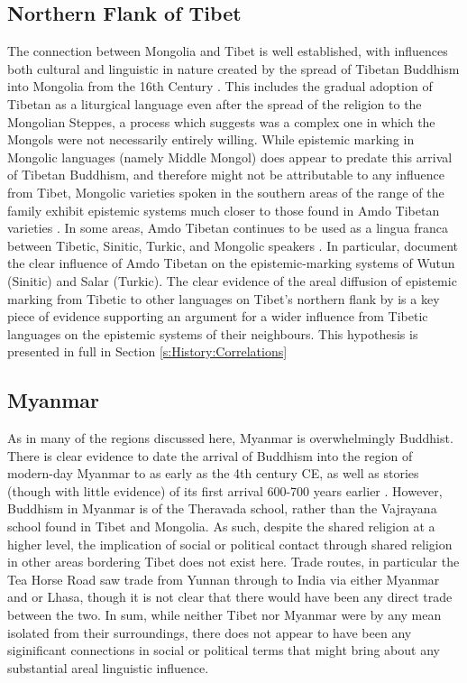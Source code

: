 \subsection{Northern Flank of Tibet}\label{ss:History:Amdo}
The connection between Mongolia and Tibet is well established, with influences both cultural and linguistic in nature created by the spread of Tibetan Buddhism into Mongolia from the 16th Century \cite{Elverskog2007}. This includes the gradual adoption of Tibetan as a liturgical language even after the spread of the religion to the Mongolian Steppes, a process which  suggests was a complex one in which the Mongols were not necessarily entirely willing. While epistemic marking in Mongolic languages (namely Middle Mongol) does appear to predate this arrival of Tibetan Buddhism, and therefore might not be attributable to any influence from Tibet, Mongolic varieties spoken in the southern areas of the range of the family exhibit epistemic systems much closer to those found in Amdo Tibetan varieties \cite{Brosig2018}. In some areas, Amdo Tibetan continues to be used as a lingua franca between Tibetic, Sinitic, Turkic, and Mongolic speakers \cite{Sandman2016}. In particular,  document the clear influence of Amdo Tibetan on the epistemic-marking systems of Wutun (Sinitic) and Salar (Turkic). The clear evidence of the areal diffusion of epistemic marking from Tibetic to other languages on Tibet's northern flank by  is a key piece of evidence supporting an argument for a wider influence from Tibetic languages on the epistemic systems of their neighbours. This hypothesis is presented in full in Section \ref{s:History:Correlations}

\subsection{Myanmar}
As in many of the regions discussed here, Myanmar is overwhelmingly Buddhist. There is clear evidence to date the arrival of Buddhism into the region of modern-day Myanmar to as early as the 4th century CE, as well as stories (though with little evidence) of its first arrival 600-700 years earlier \cite{Bretfeld2019}. However, Buddhism in Myanmar is of the Theravada school, rather than the Vajrayana school found in Tibet and Mongolia. As such, despite the shared religion at a higher level, the implication of social or political contact through shared religion in other areas bordering Tibet does not exist here.
Trade routes, in particular the Tea Horse Road \cite{Sigley2020} saw trade from Yunnan through to India via either Myanmar and or Lhasa, though it is not clear that there would have been any direct trade between the two. In sum, while neither Tibet nor Myanmar were by any mean isolated from their surroundings, there does not appear to have been any siginificant connections in social or political terms that might bring about any substantial areal linguistic influence.



